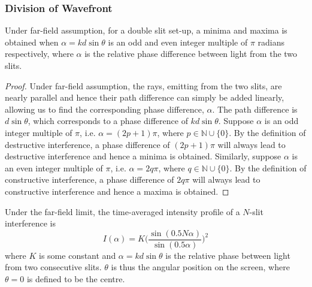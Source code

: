 \documentclass[a4paper]{article}
\begin{document}
\subsubsection*{Division of Wavefront}
\begin{thm}
Under far-field assumption, for a double slit set-up, a minima and maxima is obtained when $\alpha=kd\sin\theta$ is an odd and even integer multiple of $\pi$ radians respectively, where $\alpha$ is the relative phase difference between light from the two slits.
\end{thm}
\begin{proof}
Under far-field assumption, the rays, emitting from the two slits, are nearly parallel and hence their path difference can simply be added linearly, allowing us to find the corresponding phase difference, $\alpha$. The path difference is $d\sin\theta$, which corresponds to a phase difference of $kd\sin\theta$. Suppose $\alpha$ is an odd integer multiple of $\pi$, i.e. $\alpha=(2p+1)\pi$, 
where $p\in\mathbb{N}\cup\{0\}$. By the definition of destructive interference, a phase difference of $(2p+1)\pi$ will always lead to destructive interference and hence a minima is obtained. Similarly, suppose $\alpha$ is an even integer multiple of $\pi$, i.e. $\alpha=2q\pi$, 
where $q\in\mathbb{N}\cup\{0\}$. By the definition of constructive interference, a phase difference of $2q\pi$ will always lead to constructive interference and hence a maxima is obtained.
\end{proof}
\begin{thm}
Under the far-field limit, the time-averaged intensity profile of a $N$-slit interference is
$$I(\alpha)=K\bigg(\frac{\sin(0.5N\alpha)}{\sin(0.5\alpha)}\bigg)^2$$
where $K$ is some constant and $\alpha=kd\sin\theta$ is the relative phase between light from two consecutive slits. $\theta$ is thus the angular position on the screen, where $\theta=0$ is defined to be the centre.
\end{thm}
\end{document}
